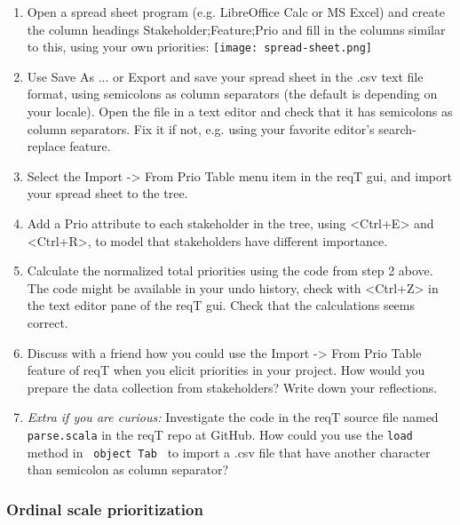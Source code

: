 \documentclass[11pt]{article}
\begin{document}
\begin{framed}
\begin{enumerate}
\item Open a spread sheet program (e.g. LibreOffice Calc or MS Excel) and create the column headings Stakeholder;Feature;Prio and fill in the columns similar to this, using your own priorities:
\texttt{[image: spread-sheet.png]}
\item Use Save As ... or Export and save your spread sheet in the .csv text file format, using semicolons as column separators (the default is depending on your locale). Open the file in a text editor and check that it has semicolons as column separators. Fix it if not, e.g. using your favorite editor's search-replace feature.
\item Select the Import -> From Prio Table menu item in the reqT gui, and import your spread sheet to the tree.
\item Add a Prio attribute to each stakeholder in the tree, using <Ctrl+E> and <Ctrl+R>, to model that stakeholders have different importance. 
\item Calculate the normalized total priorities using the code from step 2 above. The code might be available in your undo history, check with <Ctrl+Z> in the text editor pane of the reqT gui. Check that the calculations seems correct.
\item Discuss with a friend how you could use the Import -> From Prio Table feature of reqT when you elicit priorities in your project. How would you prepare the data collection from stakeholders? Write down your reflections.
\vspace{12em}
\item {\it Extra if you are curious:} Investigate the code in the reqT source file named \verb+parse.scala+ in the reqT repo at GitHub. How could you use the \verb+load+ method in \verb+ object Tab + to import a .csv file that have another character than semicolon as column separator? 
\end{enumerate}

\end{framed}
\newpage\clearpage
\subsubsection{Ordinal scale prioritization}
\end{document}
